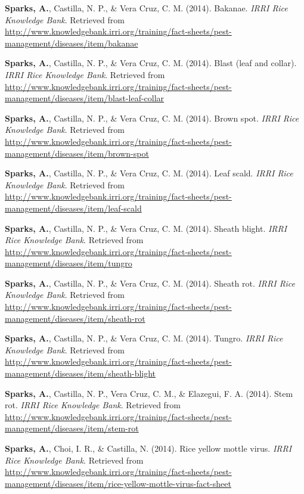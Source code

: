 \documentclass[11pt, a4paper]{awesome-cv}
\begin{document}
\leavevmode\hypertarget{ref-Sparks2014}{}%
\textbf{Sparks, A.}, Castilla, N. P., \& Vera Cruz, C. M. (2014). Bakanae. \emph{IRRI Rice Knowledge Bank}. Retrieved from \url{http://www.knowledgebank.irri.org/training/fact-sheets/pest-management/diseases/item/bakanae}

\leavevmode\hypertarget{ref-Sparks2014b}{}%
\textbf{Sparks, A.}, Castilla, N. P., \& Vera Cruz, C. M. (2014). Blast (leaf and collar). \emph{IRRI Rice Knowledge Bank}. Retrieved from \url{http://www.knowledgebank.irri.org/training/fact-sheets/pest-management/diseases/item/blast-leaf-collar}

\leavevmode\hypertarget{ref-Sparks2014a}{}%
\textbf{Sparks, A.}, Castilla, N. P., \& Vera Cruz, C. M. (2014). Brown spot. \emph{IRRI Rice Knowledge Bank}. Retrieved from \url{http://www.knowledgebank.irri.org/training/fact-sheets/pest-management/diseases/item/brown-spot}

\leavevmode\hypertarget{ref-Sparks2014e}{}%
\textbf{Sparks, A.}, Castilla, N. P., \& Vera Cruz, C. M. (2014). Leaf scald. \emph{IRRI Rice Knowledge Bank}. Retrieved from \url{http://www.knowledgebank.irri.org/training/fact-sheets/pest-management/diseases/item/leaf-scald}

\leavevmode\hypertarget{ref-Sparks2014c}{}%
\textbf{Sparks, A.}, Castilla, N. P., \& Vera Cruz, C. M. (2014). Sheath blight. \emph{IRRI Rice Knowledge Bank}. Retrieved from \url{http://www.knowledgebank.irri.org/training/fact-sheets/pest-management/diseases/item/tungro}

\leavevmode\hypertarget{ref-Sparks2014g}{}%
\textbf{Sparks, A.}, Castilla, N. P., \& Vera Cruz, C. M. (2014). Sheath rot. \emph{IRRI Rice Knowledge Bank}. Retrieved from \url{http://www.knowledgebank.irri.org/training/fact-sheets/pest-management/diseases/item/sheath-rot}

\leavevmode\hypertarget{ref-Sparks2014d}{}%
\textbf{Sparks, A.}, Castilla, N. P., \& Vera Cruz, C. M. (2014). Tungro. \emph{IRRI Rice Knowledge Bank}. Retrieved from \url{http://www.knowledgebank.irri.org/training/fact-sheets/pest-management/diseases/item/sheath-blight}

\leavevmode\hypertarget{ref-Sparks2014h}{}%
\textbf{Sparks, A.}, Castilla, N. P., Vera Cruz, C. M., \& Elazegui, F. A. (2014). Stem rot. \emph{IRRI Rice Knowledge Bank}. Retrieved from \url{http://www.knowledgebank.irri.org/training/fact-sheets/pest-management/diseases/item/stem-rot}

\leavevmode\hypertarget{ref-Sparks2014i}{}%
\textbf{Sparks, A.}, Choi, I. R., \& Castilla, N. (2014). Rice yellow mottle virus. \emph{IRRI Rice Knowledge Bank}. Retrieved from \url{http://www.knowledgebank.irri.org/training/fact-sheets/pest-management/diseases/item/rice-yellow-mottle-virus-fact-sheet}
\end{document}
